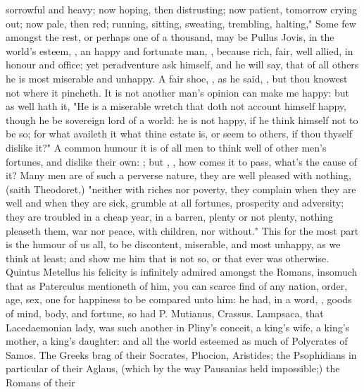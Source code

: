 sorrowful and heavy; now hoping, then distrusting; now patient, tomorrow crying
out; now pale, then red; running, sitting, sweating, trembling, halting,"
\etc{} Some few amongst the rest, or perhaps one of a thousand, may be Pullus
Jovis, in the world's esteem, , an happy and
fortunate man, , because rich, fair, well allied, in
honour and office; yet peradventure ask himself, and he will say, that of all
others he is most miserable and unhappy. A fair shoe,
, as he said, , but thou knowest not where it pincheth. It is not another man's
opinion can make me happy: but as \Seneca{} well hath it, "He
is a miserable wretch that doth not account himself happy, though he be
sovereign lord of a world: he is not happy, if he think himself not to be so;
for what availeth it what thine estate is, or seem to others, if thou thyself
dislike it?" A common humour it is of all men to think well of other men's
fortunes, and dislike their own: ; but ,
\etc{}, how comes it to pass, what's the cause of it? Many men are of such a
perverse nature, they are well pleased with nothing, (saith
Theodoret,) "neither with riches nor poverty, they
complain when they are well and when they are sick, grumble at all fortunes,
prosperity and adversity; they are troubled in a cheap year, in a barren,
plenty or not plenty, nothing pleaseth them, war nor peace, with children, nor
without." This for the most part is the humour of us all, to be discontent,
miserable, and most unhappy, as we think at least; and show me him that is not
so, or that ever was otherwise. Quintus Metellus his felicity is infinitely
admired amongst the Romans, insomuch that as Paterculus
mentioneth of him, you can scarce find of any nation, order, age, sex, one for
happiness to be compared unto him: he had, in a word, , goods of mind, body, and fortune, so had P. Mutianus,
Crassus. Lampsaca, that Lacedaemonian lady, was such
another in Pliny's conceit, a king's wife, a king's
mother, a king's daughter: and all the world esteemed as much of Polycrates of
Samos. The Greeks brag of their Socrates, Phocion, Aristides; the Psophidians
in particular of their Aglaus, 
(which by the way Pausanias held impossible;) the Romans of their
